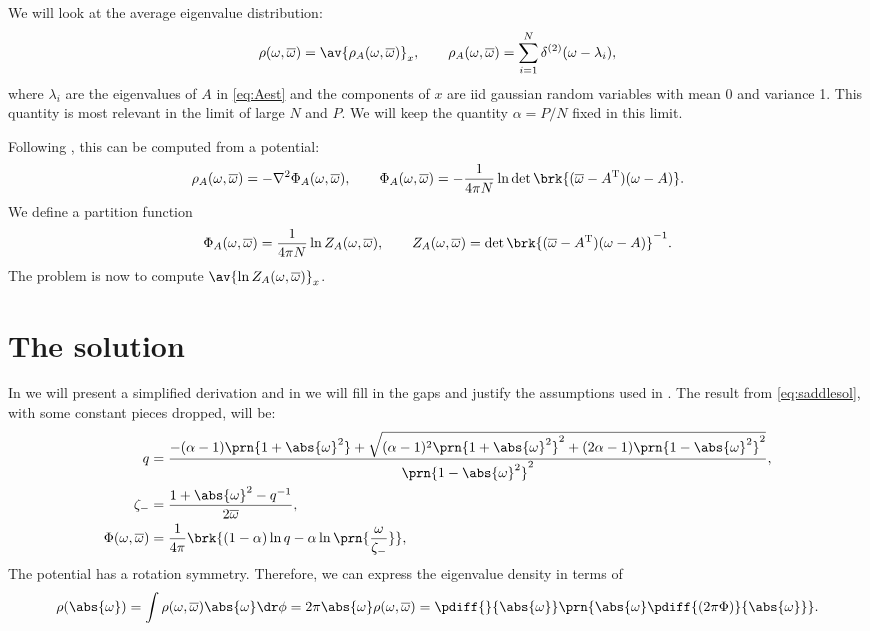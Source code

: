 \documentclass[12pt]{article}
\newcommand{\inv}{^{-1}}
\newcommand{\trans}{^\mathrm{T}}
\newcommand{\omb}{\overline{\omega}}
\newcommand{\oa}{\abs{\omega}}
\newcommand{\opo}{\prn{1+\abs{\omega}^2}}
\newcommand{\omo}{\prn{1-\abs{\omega}^2}}
\begin{document}
We will look at the average eigenvalue distribution:
%
\begin{equation}\label{eq:eigdist}
  \rho(\omega,\omb) = \av{\rho_A(\omega,\omb)}_x,
  \qquad
  \rho_A(\omega,\omb) = \sum_{i=1}^N \delta^{(2)}(\omega-\lambda_i),
\end{equation}
%
where $\lambda_i$ are the eigenvalues of $A$ in \eqref{eq:Aest} and
the components of $x$ are iid gaussian random variables with mean 0 and variance 1.
This quantity is most relevant in the limit of large $N$ and $P$.
We will keep the quantity $\alpha=P/N$ fixed in this limit.

Following \cite{Sommers1988asymmetric}, this can be computed from a potential:
%
\begin{equation}\label{eq:potential}
  \rho_A(\omega,\omb) = -\nabla^2 \Phi_A(\omega,\omb),
  \qquad
  \Phi_A(\omega,\omb) = -\frac{1}{4\pi N} \ln\det \brk{(\omb-A\trans)(\omega-A)}.
\end{equation}
%
We define a partition function
%
\begin{equation}\label{eq:partfn}
  \Phi_A(\omega,\omb) = \frac{1}{4\pi N} \ln Z_A(\omega,\omb),
  \qquad
  Z_A(\omega,\omb) = \det \brk{(\omb-A\trans)(\omega-A)}\inv.
\end{equation}
%
The problem is now to compute $\av{\ln Z_A(\omega,\omb)}_x$.


\section{The solution}\label{sec:solution}

In  we will present a simplified derivation and in  we will fill in the gaps and justify the assumptions used in .
The result from \eqref{eq:saddlesol}, with some constant pieces dropped, will be:
%
\begin{equation}\label{eq:phisol}
\begin{aligned}
  q &= \frac{ -(\alpha-1)\opo + \sqrt{ (\alpha-1)^2\opo^2 + (2\alpha-1)\omo^2 } }{\omo^2},\\
  \zeta_- &= \frac{1+\abs{\omega}^2-q\inv}{2\omb},\\
  \Phi(\omega,\omb) &= \frac{1}{4\pi}\brk{ (1-\alpha)\ln q -\alpha\ln\prn{\frac{\omega}{\zeta_-}} },
\end{aligned}
\end{equation}
%
The potential has a rotation symmetry.
Therefore, we can express the eigenvalue density in terms of
%
\begin{equation}\label{eq:radialrho}
  \rho(\oa) = \int \rho(\omega,\omb)\oa\dr\phi = 2\pi\oa\rho(\omega,\omb)
   = \pdiff{}{\oa}\prn{\oa\pdiff{(2\pi\Phi)}{\oa}}.
\end{equation}
%
\end{document}
